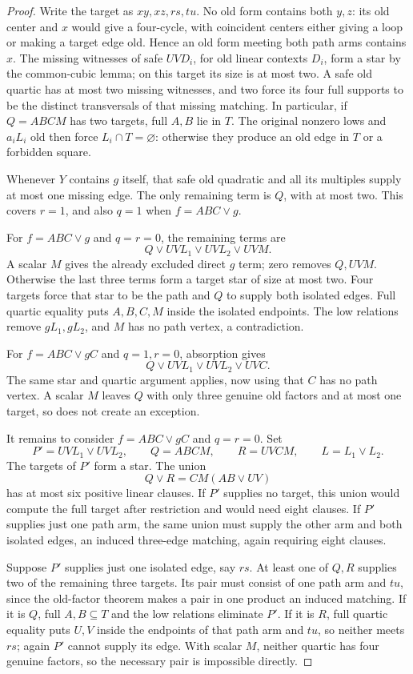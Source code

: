 \documentclass[11pt]{article}
\theoremstyle{definition}
\theoremstyle{remark}
\begin{document}
\begin{proof}
Write the target as $xy,xz,rs,tu$. No old form contains both $y,z$: its old center and $x$ would give a four-cycle, with coincident centers either giving a loop or making a target edge old. Hence an old form meeting both path arms contains $x$. The missing witnesses of safe $UV D_i$, for old linear contexts $D_i$, form a star by the common-cubic lemma; on this target its size is at most two. A safe old quartic has at most two missing witnesses, and two force its four full supports to be the distinct transversals of that missing matching. In particular, if $Q=ABCM$ has two targets, full $A,B$ lie in $T$. The original nonzero lows and $a_iL_i$ old then force $L_i\cap T=\varnothing$: otherwise they produce an old edge in $T$ or a forbidden square.

Whenever $Y$ contains $g$ itself, that safe old quadratic and all its multiples supply at most one missing edge. The only remaining term is $Q$, with at most two. This covers $r=1$, and also $q=1$ when $f=ABC\vee g$.

For $f=ABC\vee g$ and $q=r=0$, the remaining terms are
\[
 Q\vee UVL_1\vee UVL_2\vee UVM.
\]
A scalar $M$ gives the already excluded direct $g$ term; zero removes $Q,UVM$. Otherwise the last three terms form a target star of size at most two. Four targets force that star to be the path and $Q$ to supply both isolated edges. Full quartic equality puts $A,B,C,M$ inside the isolated endpoints. The low relations remove $gL_1,gL_2$, and $M$ has no path vertex, a contradiction.

For $f=ABC\vee gC$ and $q=1,r=0$, absorption gives
\[
 Q\vee UVL_1\vee UVL_2\vee UVC.
\]
The same star and quartic argument applies, now using that $C$ has no path vertex. A scalar $M$ leaves $Q$ with only three genuine old factors and at most one target, so does not create an exception.

It remains to consider $f=ABC\vee gC$ and $q=r=0$. Set
\[
 P'=UVL_1\vee UVL_2,\qquad Q=ABCM,\qquad R=UVCM,\qquad L=L_1\vee L_2.
\]
The targets of $P'$ form a star. The union
\[
 Q\vee R=CM(AB\vee UV)
\]
has at most six positive linear clauses. If $P'$ supplies no target, this union would compute the full target after restriction and would need eight clauses. If $P'$ supplies just one path arm, the same union must supply the other arm and both isolated edges, an induced three-edge matching, again requiring eight clauses.

Suppose $P'$ supplies just one isolated edge, say $rs$. At least one of $Q,R$ supplies two of the remaining three targets. Its pair must consist of one path arm and $tu$, since the old-factor theorem makes a pair in one product an induced matching. If it is $Q$, full $A,B\subseteq T$ and the low relations eliminate $P'$. If it is $R$, full quartic equality puts $U,V$ inside the endpoints of that path arm and $tu$, so neither meets $rs$; again $P'$ cannot supply its edge. With scalar $M$, neither quartic has four genuine factors, so the necessary pair is impossible directly.


\end{proof}
\end{document}
